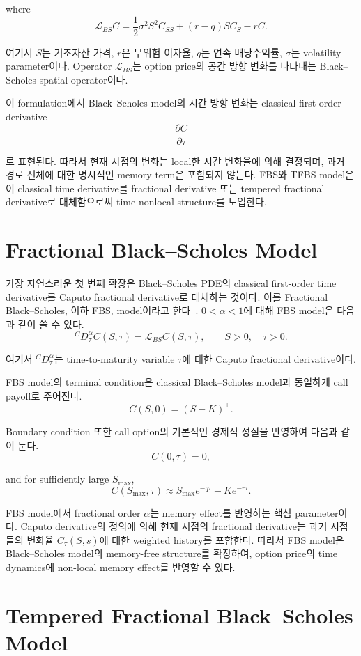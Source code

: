 \documentclass[11pt,a4paper]{report}
\begin{document}
where
\[
\mathcal{L}_{BS}C
=
\frac{1}{2}\sigma^2S^2C_{SS}
+
(r-q)SC_S
-
rC.
\]

여기서 $S$는 기초자산 가격, $r$은 무위험 이자율, $q$는 연속 배당수익률, $\sigma$는 volatility parameter이다. Operator $\mathcal{L}_{BS}$는 option price의 공간 방향 변화를 나타내는 Black--Scholes spatial operator이다.

이 formulation에서 Black--Scholes model의 시간 방향 변화는 classical first-order derivative
\[
\frac{\partial C}{\partial \tau}
\]

로 표현된다. 따라서 현재 시점의 변화는 local한 시간 변화율에 의해 결정되며, 과거 경로 전체에 대한 명시적인 memory term은 포함되지 않는다. FBS와 TFBS model은 이 classical time derivative를 fractional derivative 또는 tempered fractional derivative로 대체함으로써 time-nonlocal structure를 도입한다.

\section{Fractional Black--Scholes Model}

가장 자연스러운 첫 번째 확장은 Black--Scholes PDE의 classical first-order time derivative를 Caputo fractional derivative로 대체하는 것이다. 이를 Fractional Black--Scholes, 이하 FBS, model이라고 한다~\cite{Wyss2000,Magdziarz2009}. $0<\alpha<1$에 대해 FBS model은 다음과 같이 쓸 수 있다.
\[
{}^C D_\tau^\alpha C(S,\tau)
=
\mathcal{L}_{BS}C(S,\tau),
\qquad S>0,\quad \tau>0.
\]

여기서 ${}^C D_\tau^\alpha$는 time-to-maturity variable $\tau$에 대한 Caputo fractional derivative이다.

FBS model의 terminal condition은 classical Black--Scholes model과 동일하게 call payoff로 주어진다.
\[
C(S,0)
=
(S-K)^+.
\]

Boundary condition 또한 call option의 기본적인 경제적 성질을 반영하여 다음과 같이 둔다.
\[
C(0,\tau)=0,
\]

and for sufficiently large $S_{\max}$,
\[
C(S_{\max},\tau)
\approx
S_{\max}e^{-q\tau}
-
Ke^{-r\tau}.
\]

FBS model에서 fractional order $\alpha$는 memory effect를 반영하는 핵심 parameter이다. Caputo derivative의 정의에 의해 현재 시점의 fractional derivative는 과거 시점들의 변화율 $C_\tau(S,s)$에 대한 weighted history를 포함한다. 따라서 FBS model은 Black--Scholes model의 memory-free structure를 확장하여, option price의 time dynamics에 non-local memory effect를 반영할 수 있다.

\section{Tempered Fractional Black--Scholes Model}
\end{document}
